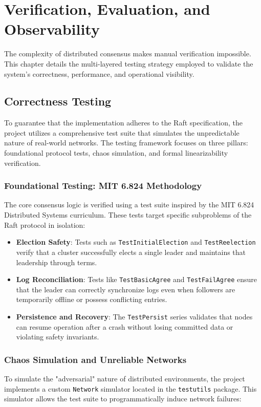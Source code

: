 \chapter{Verification, Evaluation, and Observability}
\label{ch:verification}

The complexity of distributed consensus makes manual verification impossible. This chapter details the multi-layered testing strategy employed to validate the system's correctness, performance, and operational visibility.

\section{Correctness Testing}
To guarantee that the implementation adheres to the Raft specification, the project utilizes a comprehensive test suite that simulates the unpredictable nature of real-world networks. The testing framework focuses on three pillars: foundational protocol tests, chaos simulation, and formal linearizability verification.

\subsection{Foundational Testing: MIT 6.824 Methodology}
The core consensus logic is verified using a test suite inspired by the MIT 6.824 Distributed Systems curriculum. These tests target specific subproblems of the Raft protocol in isolation:

\begin{itemize}
    \item \textbf{Election Safety}: Tests such as \texttt{TestInitialElection} and \texttt{TestReelection} verify that a cluster successfully elects a single leader and maintains that leadership through terms.
    \item \textbf{Log Reconciliation}: Tests like \texttt{TestBasicAgree} and \texttt{TestFailAgree} ensure that the leader can correctly synchronize logs even when followers are temporarily offline or possess conflicting entries.
    \item \textbf{Persistence and Recovery}: The \texttt{TestPersist} series validates that nodes can resume operation after a crash without losing committed data or violating safety invariants.
\end{itemize}

\subsection{Chaos Simulation and Unreliable Networks}
To simulate the "adversarial" nature of distributed environments, the project implements a custom \texttt{Network} simulator located in the \texttt{testutils} package. This simulator allows the test suite to programmatically induce network failures:

